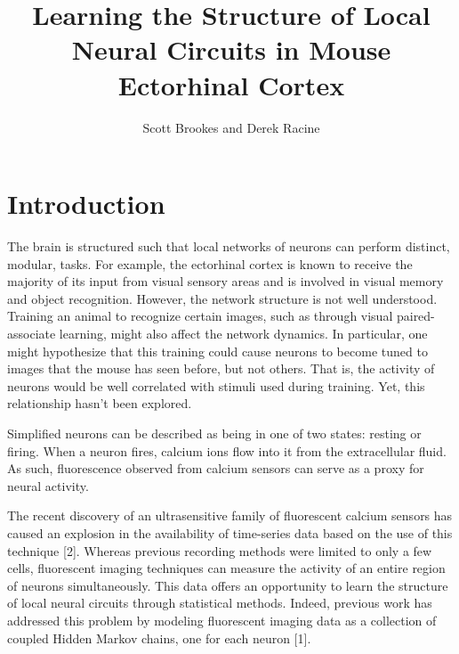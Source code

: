 \documentclass{article}
\begin{document}
\title{Learning the Structure of Local Neural Circuits in Mouse Ectorhinal Cortex}
\author{Scott Brookes and Derek Racine}

\maketitle

\section*{Introduction}
The brain is structured such that local networks of neurons can perform 
distinct, modular, tasks. For example, the ectorhinal cortex is known to 
receive the majority of its input from visual sensory areas and is involved 
in visual memory and object recognition. However, the network structure is 
not well understood. Training an animal to 
recognize certain images, such as through visual paired-associate learning, might also affect the network dynamics. In particular,
one might hypothesize that this training could cause neurons to
become tuned to images that the mouse has seen before, but not others. That is, the activity of neurons would be well correlated with stimuli used during training. Yet, this relationship hasn't been explored. \par 

Simplified neurons can be described as being in one of two states: resting or firing. When a neuron fires, calcium ions flow into it from the extracellular fluid. As such, fluorescence observed from calcium sensors can serve as a proxy for neural activity. \par

The recent discovery of an ultrasensitive family of fluorescent calcium sensors has caused an explosion in the availability of time-series data based on the use of this technique [2]. Whereas previous recording methods were limited to only a few cells, fluorescent imaging techniques can measure the activity of an entire region of neurons simultaneously. This data offers an opportunity to learn the structure of local neural circuits through statistical methods. Indeed, previous work has addressed this problem by modeling fluorescent imaging data as a collection of coupled Hidden Markov chains, one for each neuron [1]. \par

\end{document}
